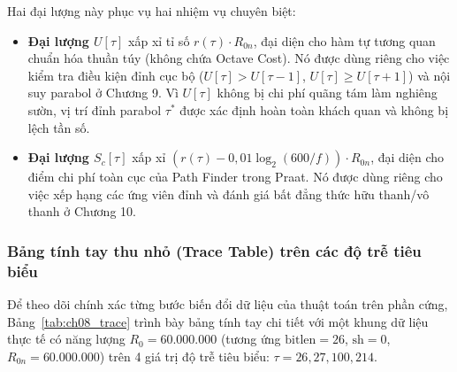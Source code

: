 Hai đại lượng này phục vụ hai nhiệm vụ chuyên biệt:
\begin{itemize}[leftmargin=1.5em, itemsep=2pt]
    \item \textbf{Đại lượng $U[\tau]$} xấp xỉ tỉ số $r(\tau) \cdot R_{0n}$, đại diện cho hàm tự tương quan chuẩn hóa thuần túy (không chứa Octave Cost). Nó được dùng riêng cho việc kiểm tra điều kiện đỉnh cục bộ ($U[\tau] > U[\tau-1]$, $U[\tau] \ge U[\tau+1]$) và nội suy parabol ở Chương 9. Vì $U[\tau]$ không bị chi phí quãng tám làm nghiêng sườn, vị trí đỉnh parabol $\tau^*$ được xác định hoàn toàn khách quan và không bị lệch tần số.
    \item \textbf{Đại lượng $S_c[\tau]$} xấp xỉ $(r(\tau) - 0{,}01 \log_2(600/f)) \cdot R_{0n}$, đại diện cho điểm chi phí toàn cục của Path Finder trong Praat. Nó được dùng riêng cho việc xếp hạng các ứng viên đỉnh và đánh giá bất đẳng thức hữu thanh/vô thanh ở Chương 10.
\end{itemize}

\subsubsection*{Bảng tính tay thu nhỏ (Trace Table) trên các độ trễ tiêu biểu}
Để theo dõi chính xác từng bước biến đổi dữ liệu của thuật toán trên phần cứng, Bảng~\ref{tab:ch08_trace} trình bày bảng tính tay chi tiết với một khung dữ liệu thực tế có năng lượng $R_0 = 60.000.000$ (tương ứng $\text{bitlen} = 26$, $\text{sh} = 0$, $R_{0n} = 60.000.000$) trên 4 giá trị độ trễ tiêu biểu: $\tau = 26, 27, 100, 214$.

